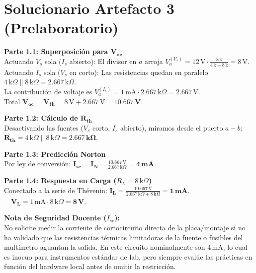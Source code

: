 \documentclass[11pt, a4paper]{article}
\begin{document}
\section*{Solucionario Artefacto 3 (Prelaboratorio)}
\textbf{Parte 1.1: Superposición para $\bm{V_{oc}}$}\\
Actuando $V_s$ sola ($I_s$ abierto): El divisor en $a$ arroja $V_a^{(V_s)} = 12\,\text{V} \cdot \frac{8\,\text{k}}{4\,\text{k}+8\,\text{k}} = 8\,\text{V}$.\\
Actuando $I_s$ sola ($V_s$ en corto): Las resistencias quedan en paralelo $4\,\text{k}\Omega \parallel 8\,\text{k}\Omega = 2.667\,\text{k}\Omega$. \\
La contribución de voltaje es $V_a^{(I_s)} = 1\,\text{mA} \cdot 2.667\,\text{k}\Omega = 2.667\,\text{V}$.\\
Total $\bm{V_{oc} = V_{th}} = 8\,\text{V} + 2.667\,\text{V} = \mathbf{10.667\,\text{V}}$.

\vspace{0.2cm}
\noindent\textbf{Parte 1.2: Cálculo de $\bm{R_{th}}$}\\
Desactivando las fuentes ($V_s$ corto, $I_s$ abierto), miramos desde el puerto $a-b$:\\
$\mathbf{R_{th}} = 4\,\text{k}\Omega \parallel 8\,\text{k}\Omega = \mathbf{2.667\,\text{k}\Omega}$.

\vspace{0.2cm}
\noindent\textbf{Parte 1.3: Predicción Norton}\\
Por ley de conversión: $\mathbf{I_{sc}} = \mathbf{I_N} = \frac{10.667\,\text{V}}{2.667\,\text{k}\Omega} = \mathbf{4\,\text{mA}}$.

\vspace{0.2cm}
\noindent\textbf{Parte 1.4: Respuesta en Carga ($R_L = 8\,\text{k}\Omega$)}\\
Conectado a la serie de Thévenin: 
$\mathbf{I_L} = \frac{10.667\,\text{V}}{2.667\,\text{k}\Omega + 8\,\text{k}\Omega} = \mathbf{1\,\text{mA}}$. $\quad\mathbf{V_L} = 1\,\text{mA} \cdot 8\,\text{k}\Omega = \mathbf{8\,\text{V}}$.

\vspace{0.2cm}
\textbf{Nota de Seguridad Docente ($I_{sc}$):}\\
No solicite medir la corriente de cortocircuito directa de la placa/montaje si no ha validado que las resistencias térmicas limitadoras de la fuente o fusibles del multímetro aguantan la salida. En este circuito nominalmente son $4\,\text{mA}$, lo cual es inocuo para instrumentos estándar de lab, pero siempre evalúe las prácticas en función del hardware local antes de omitir la restricción.
\end{document}
